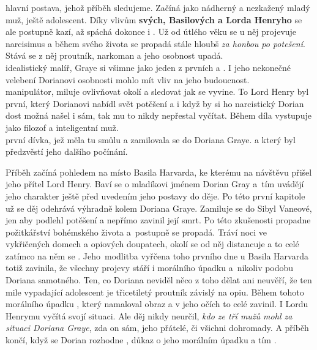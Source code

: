 \documentclass{extarticle} %
\begin{document}
\noindent 
{} hlavní postava, jehož příběh sledujeme.
Začíná jako nádherný a nezkažený mladý muž, ještě adolescent.
Díky vlivům \textbf{svých, Basilových a Lorda Henryho} se ale postupně kazí,
až spáchá dokonce i .
Už od útlého věku se u něj projevuje narcisimus
a během svého života se propadá stále hloubš \textit{za honbou po potešení}.
Stává se z něj proutník, narkoman a jeho osobnost upadá. \\
 idealistický malíř, Graye si všimne jako jeden z prvních a .
I jeho nekonečné velebení Dorianovi osobnosti mohlo mít vliv na jeho budoucnost. \\
 manipulátor, miluje ovlivňovat okolí a sledovat jak se vyvine.
To Lord Henry byl první, který Dorianovi nabídl svět potěšení
a i když by si ho narcistický Dorian dost možná našel i sám, tak mu to nikdy nepřestal vyčítat.
Během díla vystupuje jako filozof a inteligentní muž. \\
 první dívka, jež měla tu smůlu a zamilovala se do Doriana Graye.
 a který byl předzvěstí jeho dalšího počínání.

\noindent 
Příběh začíná pohledem na místo Basila Harvarda, ke kterému na návštěvu přišel jeho přítel Lord Henry.
Baví se o mladíkovi jménem Dorian Gray
a~tím uvádějí jeho charakter ještě před uvedením jeho postavy do děje.
Po této první kapitole už se děj odehrává výhradně kolem Doriana Graye.
Zamiluje se do Sibyl Vaneové, jen aby podlehl potěšení a nepřímo zavinil její smrt.
Po této zkušenosti propadne požitkářství bohémského života a~postupně se propadá.
Tráví noci ve vykřičených domech a opiových doupatech, okolí se od něj distancuje
a to celé zatímco na něm se .
Jeho~modlitba vyřčena toho prvního dne u Basila Harvarda totiž zavinila,
že všechny projevy stáří i morálního úpadku 
a~nikoliv podobu Doriana samotného.
Ten, co Doriana neviděl něco z toho dělat ani neuvěří,
že ten mile vypadající adolescent je třicetiletý proutník závislý na opiu.
Během tohoto morálního úpadku ,
který namaloval obraz a v jeho očích to celé zavinil.
I Lordu Henrymu vyčítá svojí situaci.
Ale děj nikdy neurčil, \textit{kdo ze tří mužů mohl za situaci Doriana Graye},
zda on sám, jeho přátelé, či všichni dohromady.
A příběh končí, když se Dorian rozhodne ,
důkaz o jeho morálním úpadku a tím .
\end{document}
